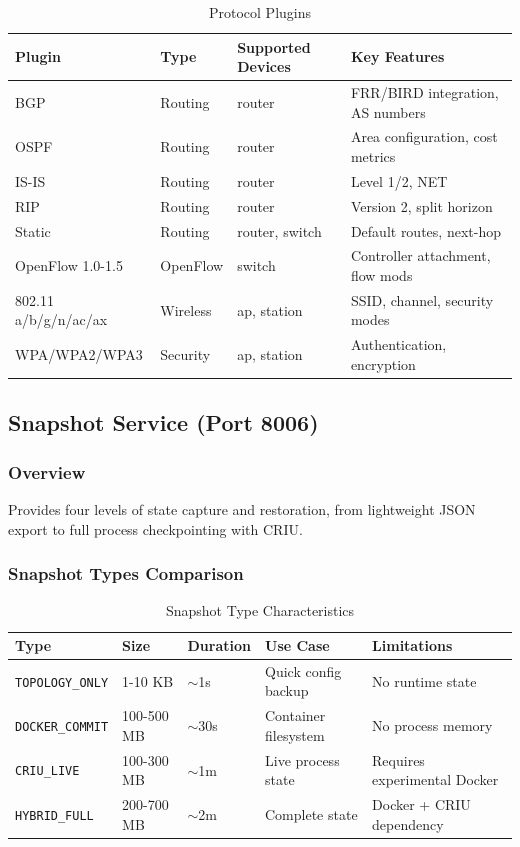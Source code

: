 \documentclass[10pt,a4paper]{article}
\begin{document}
\begin{table}[htbp]
\centering
\caption{Protocol Plugins}
\begin{tabularx}{\textwidth}{lXXX}
\toprule
\textbf{Plugin} & \textbf{Type} & \textbf{Supported Devices} & \textbf{Key Features} \\
\midrule
BGP & Routing & router & FRR/BIRD integration, AS numbers \\
OSPF & Routing & router & Area configuration, cost metrics \\
IS-IS & Routing & router & Level 1/2, NET \\
RIP & Routing & router & Version 2, split horizon \\
Static & Routing & router, switch & Default routes, next-hop \\
OpenFlow 1.0-1.5 & OpenFlow & switch & Controller attachment, flow mods \\
802.11 a/b/g/n/ac/ax & Wireless & ap, station & SSID, channel, security modes \\
WPA/WPA2/WPA3 & Security & ap, station & Authentication, encryption \\
\bottomrule
\end{tabularx}
\end{table}

\subsection{Snapshot Service (Port 8006)}

\subsubsection{Overview}
Provides four levels of state capture and restoration, from lightweight JSON export to full process checkpointing with CRIU.

\subsubsection{Snapshot Types Comparison}

\begin{table}[htbp]
\centering
\caption{Snapshot Type Characteristics}
\begin{tabularx}{\textwidth}{lXXXX}
\toprule
\textbf{Type} & \textbf{Size} & \textbf{Duration} & \textbf{Use Case} & \textbf{Limitations} \\
\midrule
\texttt{TOPOLOGY\_ONLY} & 1-10 KB & $\sim$1s & Quick config backup & No runtime state \\
\texttt{DOCKER\_COMMIT} & 100-500 MB & $\sim$30s & Container filesystem & No process memory \\
\texttt{CRIU\_LIVE} & 100-300 MB & $\sim$1m & Live process state & Requires experimental Docker \\
\texttt{HYBRID\_FULL} & 200-700 MB & $\sim$2m & Complete state & Docker + CRIU dependency \\
\bottomrule
\end{tabularx}
\end{table}
\end{document}
